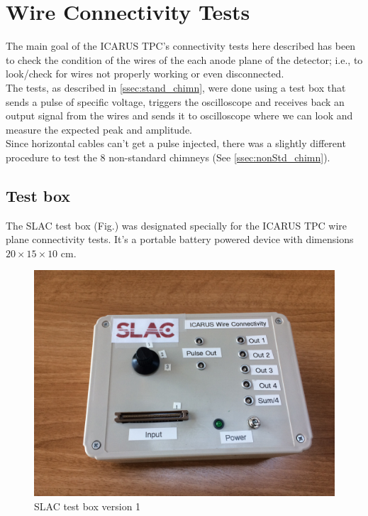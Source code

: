 \section{Wire Connectivity Tests}
\label{sec:TheTest}

The main goal of the ICARUS TPC's connectivity tests here described has been to check the condition of the wires of the each anode plane of the detector; i.e., to look/check for wires not properly working or even disconnected. \\

The tests, as described in \cref{ssec:stand_chimn}, were done using a test box that sends a pulse of specific voltage, triggers the oscilloscope and receives back an output signal from the wires and sends it to oscilloscope where we can look and measure the expected peak and amplitude.\\

Since horizontal cables can't get a pulse injected, there was a slightly different procedure to test the 8 non-standard chimneys (See \cref{ssec:nonStd_chimn}). 


\subsection{Test box}
\label{ssec:TestBox}

The SLAC test box (Fig.) was designated specially for the ICARUS TPC wire plane connectivity tests. It's a portable battery powered device with dimensions $20\times 15\times 10$ cm.\\

\begin{figure}[htb]
\centering
\includegraphics[width=0.8\linewidth]{fig/box1}
\caption{SLAC test box version 1}
\end{figure}

